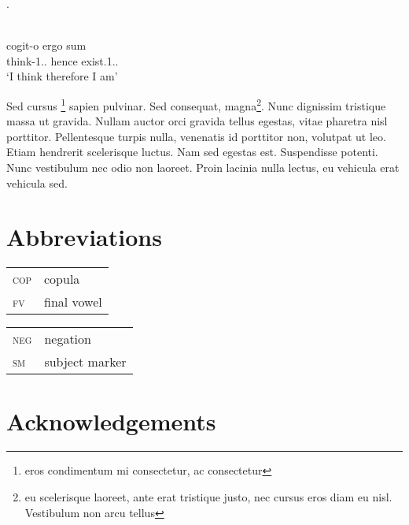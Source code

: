 \documentclass[output=paper
	        ,collection
	        ,collectionchapter
 	        ,biblatex
                ,babelshorthands
                ,newtxmath
                ,draftmode
                ,colorlinks, citecolor=brown
]{langscibook}
\begin{document}
\citep{Chomsky57a}.

\citet{Meier2017}
\ea\label{ex:1:descartes}
\\
\gll cogit-o ergo sum \\
think-1{\SG}.{\PRS}.{\IND} hence exist.1{\SG}.{\PRS}.{\IND}\\
\glt `I think therefore I am'
\z


Sed cursus \footnote{eros condimentum mi consectetur, ac consectetur} sapien pulvinar. Sed consequat, magna\footnote{eu scelerisque laoreet, ante erat tristique justo, nec cursus eros diam eu nisl. Vestibulum non arcu tellus}. Nunc dignissim tristique massa ut gravida. Nullam auctor orci gravida tellus egestas, vitae pharetra nisl porttitor. Pellentesque turpis nulla, venenatis id porttitor non, volutpat ut leo. Etiam hendrerit scelerisque luctus. Nam sed egestas est. Suspendisse potenti. Nunc vestibulum nec odio non laoreet. Proin lacinia nulla lectus, eu vehicula erat vehicula sed. 

\section*{Abbreviations}
\begin{tabularx}{.45\textwidth}{lX}
\textsc{cop} & copula\\ 
\textsc{fv} & final vowel\\
\end{tabularx}
\begin{tabularx}{.45\textwidth}{lX}
\textsc{neg} & negation\\ 
\textsc{sm} & subject marker\\
\end{tabularx}


\section*{Acknowledgements}

{\sloppy
\printbibliography[heading=subbibliography,notkeyword=this]
}
\end{document}
